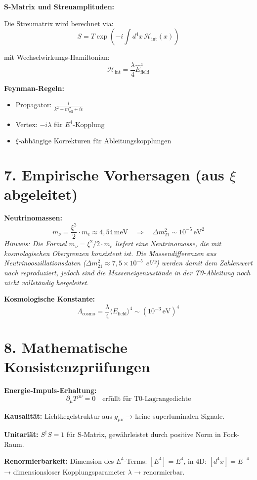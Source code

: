 	\textbf{S-Matrix und Streuamplituden:}
	
	Die Streumatrix wird berechnet via:
	\[
	S = T \exp\left(-i \int d^4x \, \mathcal{H}_{\text{int}}(x)\right)
	\]
	
	mit Wechselwirkungs-Hamiltonian:
	\[
	\mathcal{H}_{\text{int}} = \frac{\lambda}{4} \hat{E}_{\text{field}}^4
	\]
	
	\textbf{Feynman-Regeln:}
	\begin{itemize}
		\item Propagator: $\frac{i}{k^2 - m_{\text{eff}}^2 + i\epsilon}$
		\item Vertex: $-i\lambda$ für $E^4$-Kopplung
		\item $\xi$-abhängige Korrekturen für Ableitungskopplungen
	\end{itemize}
	
	\section*{7. Empirische Vorhersagen (aus $\xi$ abgeleitet)}
	
	\textbf{Neutrinomassen:}
	\[
	m_\nu = \frac{\xi^2}{2} \cdot m_e \approx 4{,}54 \, \text{meV} \quad \Rightarrow \quad \Delta m_{21}^2 \sim 10^{-5} \, \text{eV}^2
	\]
	\textit{Hinweis: Die Formel $m_\nu = \xi^2/2 \cdot m_e$ liefert eine Neutrinomasse, die mit kosmologischen Obergrenzen konsistent ist. Die Massendifferenzen aus Neutrinooszillationsdaten ($\Delta m^2_{21} \approx 7{,}5 \times 10^{-5}$ eV²) werden damit dem Zahlenwert nach reproduziert, jedoch sind die Masseneigenzustände in der T0-Ableitung noch nicht vollständig hergeleitet.}
	
	\textbf{Kosmologische Konstante:}
	\[
	\Lambda_{\text{cosmo}} = \frac{\lambda}{4} \langle E_{\text{field}} \rangle^4 \sim (10^{-3} \, \text{eV})^4
	\]
	

	
	\section*{8. Mathematische Konsistenzprüfungen}
	
	\textbf{Energie-Impuls-Erhaltung:}
	\[
	\partial_\mu T^{\mu\nu} = 0 \quad \text{erfüllt für T0-Lagrangedichte}
	\]
	
	\textbf{Kausalität:} Lichtkegelstruktur aus $g_{\mu\nu}$ → keine superluminalen Signale.
	
	\textbf{Unitariät:} $S^\dagger S = 1$ für S-Matrix, gewährleistet durch positive Norm in Fock-Raum.
	
	\textbf{Renormierbarkeit:} Dimension des $E^4$-Terms: $[E^4] = E^4$, in 4D: $[d^4x] = E^{-4}$ → dimensionsloser Kopplungsparameter $\lambda$ → renormierbar.
	